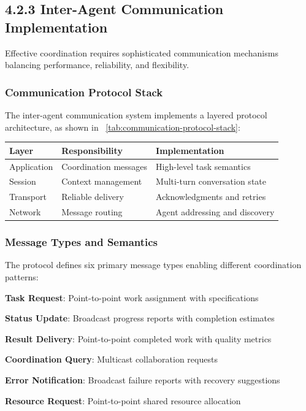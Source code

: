 \subsection*{4.2.3 Inter-Agent Communication Implementation}

Effective coordination requires sophisticated communication mechanisms balancing performance, reliability, and flexibility.

\subsubsection*{Communication Protocol Stack}
The inter-agent communication system implements a layered protocol architecture, as shown in ~\ref{tab:communication-protocol-stack}:

\begin{center}
\begin{tabular}{@{}lll@{}}
\toprule
\textbf{Layer} & \textbf{Responsibility} & \textbf{Implementation} \\
\midrule
Application & Coordination messages & High-level task semantics \\
Session & Context management & Multi-turn conversation state \\
Transport & Reliable delivery & Acknowledgments and retries \\
Network & Message routing & Agent addressing and discovery \\
\bottomrule
\end{tabular}
\label{tab:communication-protocol-stack}
\end{center}

\subsubsection*{Message Types and Semantics}

The protocol defines six primary message types enabling different coordination patterns:

\begin{compactlist}
    \item \textbf{Task Request}: Point-to-point work assignment with specifications
    \item \textbf{Status Update}: Broadcast progress reports with completion estimates
    \item \textbf{Result Delivery}: Point-to-point completed work with quality metrics
    \item \textbf{Coordination Query}: Multicast collaboration requests
    \item \textbf{Error Notification}: Broadcast failure reports with recovery suggestions
    \item \textbf{Resource Request}: Point-to-point shared resource allocation
\end{compactlist}

